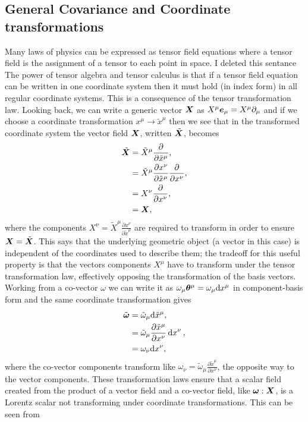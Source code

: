 \subsection{General Covariance and Coordinate transformations}\label{intro:sec:cov}
Many laws of physics can be expressed as tensor field equations where a tensor field is the assignment of a tensor to each point in space. \color{choral} I deleted this sentance \color{black} The power of tensor algebra and tensor calculus is that if a tensor field equation can be written in one coordinate system then  it must hold (in index form) in all regular coordinate systems. This is a consequence of the tensor transformation law. Looking back, we can write a generic vector $\boldsymbol{X}$ as $X^\mu \boldsymbol{e}_\mu = X^\mu \partial_\mu$ and if we choose a coordinate transformation $x^\mu \rightarrow \tilde{x}^\mu$ then we see that in the transformed coordinate system the vector field $\boldsymbol{X}$, written $\tilde{\boldsymbol{X}}$, becomes
\begin{align}
\tilde{\boldsymbol X} &= \tilde{X}^\mu\frac{\partial}{\partial \tilde{x}^\mu}, \\
              &= \tilde{X}^\mu\frac{\partial x^\nu}{\partial \tilde{x}^\mu}\frac{\partial}{\partial {x}^\nu}, \\
              &= X^\nu \frac{\partial}{\partial x^\nu}, \\
              &= \boldsymbol{X}, \
\end{align}
where the components $X^\nu = \tilde{X}^\mu\frac{\partial x^\nu}{\partial \tilde{x}^\mu}$ are required to transform in order to ensure $\boldsymbol{X}=\tilde{\boldsymbol{X}}$. This says that the underlying geometric object (a vector in this case) is independent of the coordinates used to describe them; the tradeoff for this useful property is that the vectors components $X^\mu$ have to transform under the tensor transformation law, effectively opposing the transformation of the basis vectors. Working from a co-vector $\omega$ we can write it as $\omega_\mu \boldsymbol{\theta}^\mu = \omega_\mu \dd x^\mu$ in component-basis form and the same coordinate transformation gives
\begin{align}
\tilde{\boldsymbol{\omega}} &= \tilde{\omega}_\mu \dd \tilde{x}^\mu , \\
                    &= \tilde{\omega}_\mu \frac{\partial \tilde{x}^\mu}{\partial x^\nu}\dd {x}^\nu , \\
                    &= \omega_\nu \dd x^\nu,
\end{align}
where the co-vector components transform like $\omega_\nu= \tilde{\omega}_\mu \frac{\partial \tilde{x}^\mu}{\partial x^\nu}$, the opposite way to the vector components. These transformation laws ensure that a scalar field created from the product of a vector field and a co-vector field, like $\boldsymbol{\omega}: \boldsymbol{X}$, is a Lorentz scalar not transforming under coordinate transformations. This can be seen from
